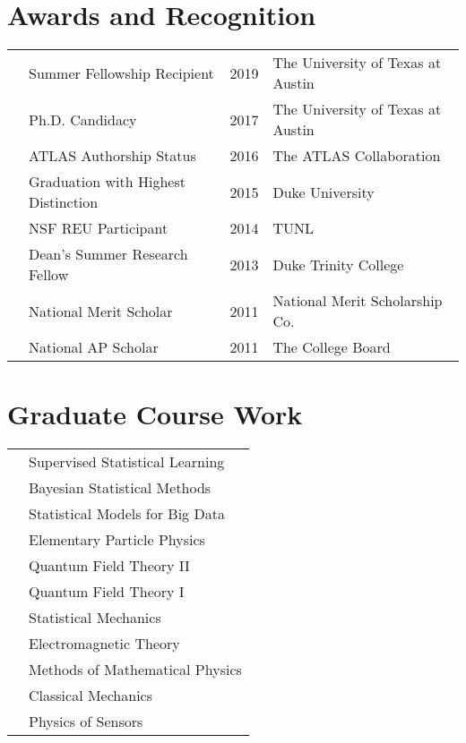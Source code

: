 \documentclass[a4paper,10pt]{article}
\begin{document}
\section{Awards and Recognition}
\begin{tabular}{clll}
    & Summer Fellowship Recipient & 2019 & The University of Texas at Austin 
    \\
    & Ph.D. Candidacy & 2017 & The University of Texas at Austin  \\
    & ATLAS Authorship Status & 2016 & The ATLAS Collaboration \\
    & Graduation with Highest Distinction & 2015 & Duke University \\
    & NSF REU Participant & 2014 & TUNL  \\
    & Dean’s Summer Research Fellow & 2013 & Duke Trinity College   \\
    & National Merit Scholar & 2011 & National Merit Scholarship Co.  \\
    & National AP Scholar & 2011 & The College Board  \\
\end{tabular}

\section{Graduate Course Work}
\begin{tabular}{ll}
    & Supervised Statistical Learning  \\
    & Bayesian Statistical Methods \\
    & Statistical Models for Big Data \\
    & Elementary Particle Physics \\
    & Quantum Field Theory II \\
    & Quantum Field Theory I  \\
    & Statistical Mechanics  \\
    & Electromagnetic Theory \\
    & Methods of Mathematical Physics \\
    & Classical Mechanics \\
    & Physics of Sensors \\
    
\end{tabular}
\end{document}
